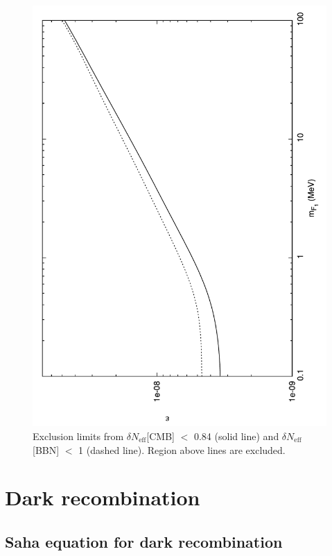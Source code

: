 \documentclass[12pt]{article}
\begin{document}
\begin{figure}[htpb]
    \centering
        \includegraphics[scale=0.5, angle=270]{fig5}
    \caption{Exclusion limits from $\delta N _{\text{eff}}$[CMB] $<$ 0.84 (solid line) and $\delta N _{\text{eff}}$[BBN] $<$ 1 (dashed line). Region above lines are excluded.}
    \label{fig:Comparison bbn cmb}
\end{figure}
%

\newpage

\section{Dark recombination}

\subsection{Saha equation for dark recombination}
\end{document}
